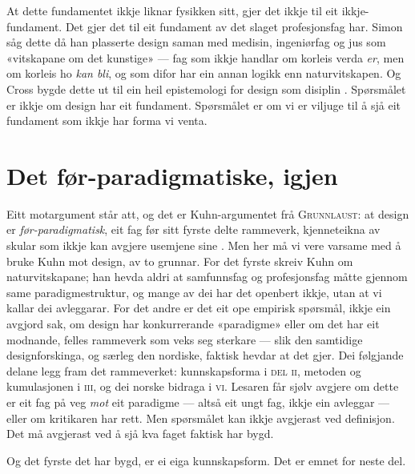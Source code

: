 At dette fundamentet ikkje liknar fysikken sitt, gjer det ikkje til eit ikkje-fundament. Det gjer det til eit fundament av det slaget profesjonsfag har. Simon såg dette då han plasserte design saman med medisin, ingeniørfag og jus som «vitskapane om det kunstige» \autocite{simon1969sciences} — fag som ikkje handlar om korleis verda \emph{er}, men om korleis ho \emph{kan bli}, og som difor har ein annan logikk enn naturvitskapen. Og Cross bygde dette ut til ein heil epistemologi for design som disiplin \autocite{cross2006}. Spørsmålet er ikkje om design har eit fundament. Spørsmålet er om vi er viljuge til å sjå eit fundament som ikkje har forma vi venta.

\section{Det før-paradigmatiske, igjen}

Eitt motargument står att, og det er Kuhn-argumentet frå \textsc{Grunnlaust}: at design er \emph{før-paradigmatisk}, eit fag før sitt fyrste delte rammeverk, kjenneteikna av skular som ikkje kan avgjere usemjene sine \autocite{kuhn1962}. Men her må vi vere varsame med å bruke Kuhn mot design, av to grunnar. For det fyrste skreiv Kuhn om naturvitskapane; han hevda aldri at samfunnsfag og profesjonsfag måtte gjennom same paradigmestruktur, og mange av dei har det openbert ikkje, utan at vi kallar dei avleggarar. For det andre er det eit ope empirisk spørsmål, ikkje ein avgjord sak, om design har konkurrerande «paradigme» eller om det har eit modnande, felles rammeverk som veks seg sterkare — slik den samtidige designforskinga, og særleg den nordiske, faktisk hevdar at det gjer. Dei følgjande delane legg fram det rammeverket: kunnskapsforma i \textsc{del ii}, metoden og kumulasjonen i \textsc{iii}, og dei norske bidraga i \textsc{vi}. Lesaren får sjølv avgjere om dette er eit fag på veg \emph{mot} eit paradigme — altså eit ungt fag, ikkje ein avleggar — eller om kritikaren har rett. Men spørsmålet kan ikkje avgjerast ved definisjon. Det må avgjerast ved å sjå kva faget faktisk har bygd.

\vignett

Og det fyrste det har bygd, er ei eiga kunnskapsform. Det er emnet for neste del.

